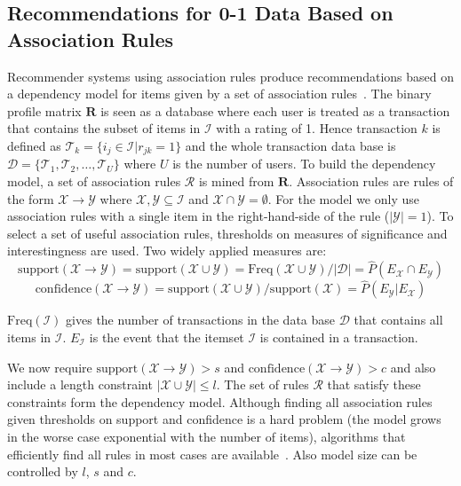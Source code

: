 \documentclass[nojss]{jss}
\newcommand{\set}[1]{\mathcal{#1}}
\newcommand{\mat}[1]{{\mathbf{#1}}}
\begin{document}
\subsection{Recommendations for 0-1 Data Based on Association Rules}
\label{sec:AR}
Recommender systems using association rules
produce recommendations based on a dependency model for items
given by a set of association
rules~\citep{Fu:2000,Mobasher:2001,Geyer-Schulz:2002,Lin:2002,Demiriz:2004}.
The binary profile matrix $\mat{R}$ is seen as a database
where each user is treated as a transaction that contains
the subset of items in $\set{I}$ with a rating of 1.
Hence transaction $k$ is defined as
$\set{T}_k = \{i_j \in \set{I} | r_{jk} = 1\}$ and
the whole transaction data base is
$\set{D} = \{\set{T}_1, \set{T}_2, \ldots, \set{T}_U\}$ where $U$ is the number of users.
To build the dependency model,
a set of association rules $\set{R}$ is mined from
$\mat{R}$. Association rules are rules of the form
$\set{X} \rightarrow \set{Y}$  where $\set{X}, \set{Y} \subseteq \set{I}$
and $\set{X} \cap \set{Y} = \emptyset$.
For the model we only use association rules with a single item in
the right-hand-side of the rule ($|\set{Y}| = 1$).
To select a set of useful association rules,
thresholds on measures of significance and interestingness are used. Two widely applied measures are:
\begin{equation*}
\mathrm{support}(\set{X} \rightarrow \set{Y}) =
\mathrm{support}(\set{X} \cup \set{Y}) =
\mathrm{Freq}(\set{X} \cup \set{Y}) / |\set{D}| = \hat{P}(E_\set{X} \cap E_\set{Y})
\end{equation*}
\begin{equation*}
\mathrm{confidence}(\set{X} \rightarrow \set{Y}) = \mathrm{support}(\set{X} \cup \set{Y}) / \mathrm{support}(\set{X}) = \hat{P}(E_\set{Y}|E_\set{X})
\end{equation*}

$\mathrm{Freq}(\set{I})$ gives the number of transactions
in the data base $\set{D}$ that contains all items in $\set{I}$.
$E_\set{I}$ is the event that the itemset $\set{I}$ is contained in a transaction.

We now require $\mathrm{support}(\set{X} \rightarrow \set{Y}) > s$ and
$\mathrm{confidence}(\set{X} \rightarrow \set{Y}) > c$
and also include a length constraint $|\set{X} \cup \set{Y}|\leq l$.
The set of rules $\set{R}$ that satisfy these constraints form the dependency
model. Although finding all association rules given thresholds
on support and confidence is a hard problem (the model grows in the
worse case exponential with the number of items), algorithms that efficiently
find all rules in most cases are
available~\citep[e.g.,][]{arules:Agrawal:1994,arules:Zaki:2000,arules:Han:2004}. Also model size can be controlled by $l$, $s$ and $c$.
\end{document}

